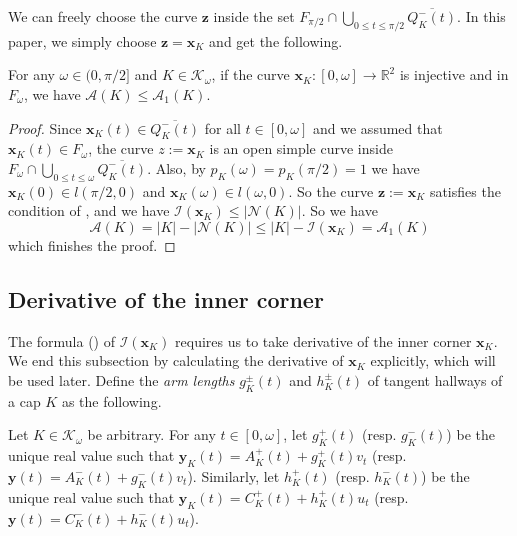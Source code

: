 We can freely choose the curve \(\mathbf{z}\) inside the set \(F_{\pi/2} \cap \bigcup_{0 \leq t \leq \pi/2} \overline{Q^-_K(t)}\). In this paper, we simply choose \(\mathbf{z} = \mathbf{x}_K\) and get the following.

\begin{theorem}

For any \(\omega \in (0, \pi/2]\) and \(K \in \mathcal{K}_{\omega}\), if the curve \(\mathbf{x}_K : [0, \omega] \to \mathbb{R}^2\) is injective and in \(F_\omega\), we have \(\mathcal{A}(K) \leq \mathcal{A}_1(K)\).

\label{thm:a1-upper-bound}
\end{theorem}

\begin{proof}
Since \(\mathbf{x}_K(t) \in \overline{Q_K^-(t)}\) for all \(t \in [0, \omega]\) and we assumed that \(\mathbf{x}_K(t) \in F_\omega\), the curve \(z := \mathbf{x}_K\) is an open simple curve inside \(F_{\omega} \cap \bigcup_{0 \leq t \leq \omega} \overline{Q^-_K(t)}\). Also, by \(p_K(\omega) = p_K(\pi/2) = 1\) we have \(\mathbf{x}_K(0) \in l(\pi/2, 0)\) and \(\mathbf{x}_K(\omega) \in l(\omega, 0)\). So the curve \(\mathbf{z} := \mathbf{x}_K\) satisfies the condition of , and we have \(\mathcal{I}(\mathbf{x}_K) \leq |\mathcal{N}(K)|\). So we have
\[
\mathcal{A}(K) = |K| - |\mathcal{N}(K)| \leq |K| - \mathcal{I}(\mathbf{x}_K) = \mathcal{A}_1(K)
\]
which finishes the proof.
\end{proof}

\subsection{Derivative of the inner corner}

The formula () of \(\mathcal{I}(\mathbf{x}_K)\) requires us to take derivative of the inner corner \(\mathbf{x}_K\). We end this subsection by calculating the derivative of \(\mathbf{x}_K\) explicitly, which will be used later. Define the \emph{arm lengths} \(g_K^{\pm}(t)\) and \(h_K^{\pm}(t)\) of tangent hallways of a cap \(K\) as the following.

\begin{definition}

Let \(K \in \mathcal{K}_\omega\) be arbitrary. For any \(t \in [0, \omega]\), let \(g_K^+(t)\) (resp. \(g_K^-(t)\)) be the unique real value such that \(\mathbf{y}_K(t) = A^+_K(t) + g_K^+(t) v_t\) (resp. \(\mathbf{y}(t) = A^-_K(t) + g_K^-(t) v_t\)). Similarly, let \(h_K^+(t)\) (resp. \(h_K^-(t)\)) be the unique real value such that \(\mathbf{y}_K(t) = C^+_K(t) + h_K^+(t) u_t\) (resp. \(\mathbf{y}(t) = C^-_K(t) + h_K^-(t) u_t\)).

\label{def:cap-tangent-arm-length}
\end{definition}


